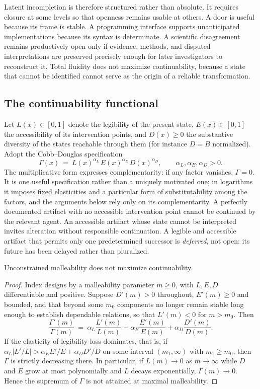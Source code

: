 Latent incompletion is therefore structured rather than absolute. It requires closure at some levels so that openness remains usable at others. A door is useful because its frame is stable. A programming interface supports unanticipated implementations because its syntax is determinate. A scientific disagreement remains productively open only if evidence, methods, and disputed interpretations are preserved precisely enough for later investigators to reconstruct it. Total fluidity does not maximize continuability, because a state that cannot be identified cannot serve as the origin of a reliable transformation.

\subsection{The continuability functional}

Let $L(x)\in[0,1]$ denote the legibility of the present state, $E(x)\in[0,1]$ the accessibility of its intervention points, and $D(x)\geq 0$ the substantive diversity of the states reachable through them (for instance $D=B$ normalized). Adopt the Cobb--Douglas specification
\begin{equation}\label{eq:Gamma}
\Gamma(x)\ =\ L(x)^{\alpha_L}\,E(x)^{\alpha_E}\,D(x)^{\alpha_D},\qquad \alpha_L,\alpha_E,\alpha_D>0.
\end{equation}
The multiplicative form expresses complementarity: if any factor vanishes, $\Gamma=0$. It is one useful specification rather than a uniquely motivated one; in logarithms it imposes fixed elasticities and a particular form of substitutability among the factors, and the arguments below rely only on its complementarity. A perfectly documented artifact with no accessible intervention point cannot be continued by the relevant agent. An accessible artifact whose state cannot be interpreted invites alteration without responsible continuation. A legible and accessible artifact that permits only one predetermined successor is \emph{deferred}, not open: its future has been delayed rather than pluralized.

\begin{proposition}\label{prop:malleability}
Unconstrained malleability does not maximize continuability.
\end{proposition}

\begin{proof}
Index designs by a malleability parameter $m\geq 0$, with $L,E,D$ differentiable and positive. Suppose $D'(m)>0$ throughout, $E'(m)\geq 0$ and bounded, and that beyond some $m_0$ components no longer remain stable long enough to establish dependable relations, so that $L'(m)<0$ for $m>m_0$. Then
\[
\frac{\Gamma'(m)}{\Gamma(m)}\ =\ \alpha_L\frac{L'(m)}{L(m)}+\alpha_E\frac{E'(m)}{E(m)}+\alpha_D\frac{D'(m)}{D(m)}.
\]
If the elasticity of legibility loss dominates, that is, if $\alpha_L|L'/L|>\alpha_E E'/E+\alpha_D D'/D$ on some interval $(m_1,\infty)$ with $m_1\geq m_0$, then $\Gamma$ is strictly decreasing there. In particular, if $L(m)\to 0$ as $m\to\infty$ while $D$ and $E$ grow at most polynomially and $L$ decays exponentially, $\Gamma(m)\to 0$. Hence the supremum of $\Gamma$ is not attained at maximal malleability.
\end{proof}

